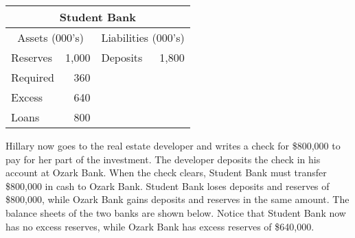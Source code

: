 \documentclass[letterpaper,12pt]{article}
\begin{document}
\begin{center}
\begin{tabular}{|l|r|l|r|}
\hline
\multicolumn{4}{|c|}{Student Bank} \\
\hline%
\multicolumn{2}{|c|}{Assets (000's)} & \multicolumn{2}{l|}{Liabilities (000's) } \\%
\hline\hline%
\multicolumn{1}{|l|}{Reserves} & \multicolumn{1}{|r|}{1,000} & \multicolumn{1}{|l|}{Deposits} & 1,800 \\%
\multicolumn{1}{|l|}{\thinspace\thinspace\thinspace\thinspace Required} & \multicolumn{1}{|r|}{360} & \multicolumn{1}{|l|}{} &  \\%
\multicolumn{1}{|l|}{\thinspace\thinspace\thinspace\thinspace\thinspace
\thinspace Excess} & \multicolumn{1}{|r|}{640} &
\multicolumn{1}{|l|}{} &
\\
\multicolumn{1}{|l|}{Loans} & \multicolumn{1}{|r|}{800} &
\multicolumn{1}{|l|}{} &  \\ \hline
\end{tabular}
\end{center}

Hillary now goes to the real estate developer and writes a check for
\$800,000 to pay for her part of the investment. The developer
deposits the check in his account at Ozark Bank. When the check
clears, Student Bank must transfer \$800,000 in cash to Ozark Bank.
Student Bank loses deposits and reserves of \$800,000, while Ozark
Bank gains deposits and reserves in the same amount. The balance
sheets of the two banks are shown below. Notice that Student Bank
now has no excess reserves, while Ozark Bank has excess reserves of
\$640,000.
\end{document}
